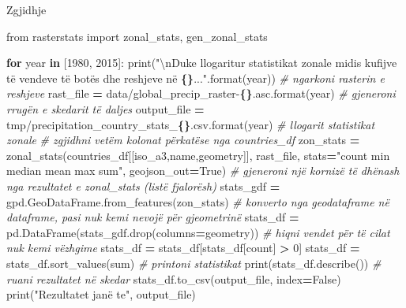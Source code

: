 \documentclass[
  ignorenonframetext,
]{beamer}
\newenvironment{Shaded}{\begin{snugshade}}{\end{snugshade}}
\newcommand{\BuiltInTok}[1]{#1}
\newcommand{\CharTok}[1]{\textcolor[rgb]{0.31,0.60,0.02}{#1}}
\newcommand{\CommentTok}[1]{\textcolor[rgb]{0.56,0.35,0.01}{\textit{#1}}}
\newcommand{\ControlFlowTok}[1]{\textcolor[rgb]{0.13,0.29,0.53}{\textbf{#1}}}
\newcommand{\DecValTok}[1]{\textcolor[rgb]{0.00,0.00,0.81}{#1}}
\newcommand{\ImportTok}[1]{#1}
\newcommand{\KeywordTok}[1]{\textcolor[rgb]{0.13,0.29,0.53}{\textbf{#1}}}
\newcommand{\NormalTok}[1]{#1}
\newcommand{\OperatorTok}[1]{\textcolor[rgb]{0.81,0.36,0.00}{\textbf{#1}}}
\newcommand{\SpecialCharTok}[1]{\textcolor[rgb]{0.81,0.36,0.00}{\textbf{#1}}}
\newcommand{\StringTok}[1]{\textcolor[rgb]{0.31,0.60,0.02}{#1}}
\newcommand{\VariableTok}[1]{\textcolor[rgb]{0.00,0.00,0.00}{#1}}
\begin{document}
\begin{frame}[fragile]{Zgjidhje}
\protect\hypertarget{zgjidhje-8}{}

\begin{Shaded}
\begin{Highlighting}[]
\ImportTok{from}\NormalTok{ rasterstats }\ImportTok{import}\NormalTok{ zonal\_stats, gen\_zonal\_stats}

\ControlFlowTok{for}\NormalTok{ year }\KeywordTok{in}\NormalTok{ [}\DecValTok{1980}\NormalTok{, }\DecValTok{2015}\NormalTok{]:}
    \BuiltInTok{print}\NormalTok{(}\StringTok{"}\CharTok{\textbackslash{}n}\StringTok{Duke llogaritur statistikat zonale midis kufijve të vendeve të botës dhe reshjeve në }\SpecialCharTok{\{\}}\StringTok{..."}\NormalTok{.}\BuiltInTok{format}\NormalTok{(year))}
    \CommentTok{\# ngarkoni rasterin e reshjeve}
\NormalTok{    rast\_file }\OperatorTok{=} \StringTok{\textquotesingle{}data/global\_precip\_raster{-}}\SpecialCharTok{\{\}}\StringTok{.asc\textquotesingle{}}\NormalTok{.}\BuiltInTok{format}\NormalTok{(year)}
    \CommentTok{\# gjeneroni rrugën e skedarit të daljes}
\NormalTok{    output\_file }\OperatorTok{=} \StringTok{\textquotesingle{}tmp/precipitation\_country\_stats\_}\SpecialCharTok{\{\}}\StringTok{.csv\textquotesingle{}}\NormalTok{.}\BuiltInTok{format}\NormalTok{(year)}
    \CommentTok{\# llogarit statistikat zonale}
    \CommentTok{\# zgjidhni vetëm kolonat përkatëse nga countries\_df}
\NormalTok{    zon\_stats }\OperatorTok{=}\NormalTok{ zonal\_stats(countries\_df[[}\StringTok{\textquotesingle{}iso\_a3\textquotesingle{}}\NormalTok{,}\StringTok{\textquotesingle{}name\textquotesingle{}}\NormalTok{,}\StringTok{\textquotesingle{}geometry\textquotesingle{}}\NormalTok{]], rast\_file, }
\NormalTok{                            stats}\OperatorTok{=}\StringTok{"count min median mean max sum"}\NormalTok{, geojson\_out}\OperatorTok{=}\VariableTok{True}\NormalTok{)}
    \CommentTok{\# gjeneroni një kornizë të dhënash nga rezultatet e zonal\_stats (listë fjalorësh)}
\NormalTok{    stats\_gdf }\OperatorTok{=}\NormalTok{ gpd.GeoDataFrame.from\_features(zon\_stats)}
    \CommentTok{\# konverto nga geodataframe në dataframe, pasi nuk kemi nevojë për gjeometrinë}
\NormalTok{    stats\_df }\OperatorTok{=}\NormalTok{ pd.DataFrame(stats\_gdf.drop(columns}\OperatorTok{=}\StringTok{\textquotesingle{}geometry\textquotesingle{}}\NormalTok{))    }
    \CommentTok{\# hiqni vendet për të cilat nuk kemi vëzhgime}
\NormalTok{    stats\_df }\OperatorTok{=}\NormalTok{ stats\_df[stats\_df[}\StringTok{\textquotesingle{}count\textquotesingle{}}\NormalTok{] }\OperatorTok{\textgreater{}} \DecValTok{0}\NormalTok{]}
\NormalTok{    stats\_df }\OperatorTok{=}\NormalTok{ stats\_df.sort\_values(}\StringTok{\textquotesingle{}sum\textquotesingle{}}\NormalTok{)}
    \CommentTok{\# printoni statistikat}
    \BuiltInTok{print}\NormalTok{(stats\_df.describe())}
    \CommentTok{\# ruani rezultatet në skedar}
\NormalTok{    stats\_df.to\_csv(output\_file, index}\OperatorTok{=}\VariableTok{False}\NormalTok{)}
    \BuiltInTok{print}\NormalTok{(}\StringTok{"Rezultatet janë te"}\NormalTok{, output\_file)}
\end{Highlighting}
\end{Shaded}
\end{frame}
\end{document}
